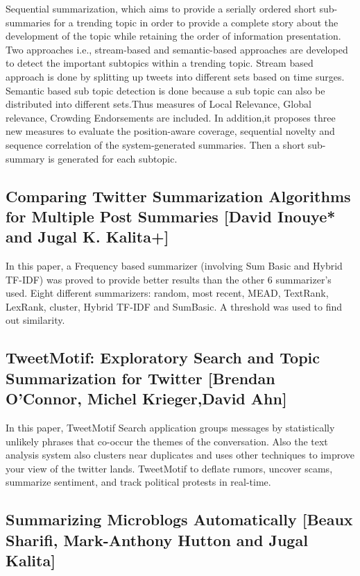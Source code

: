 \documentclass[conference]{IEEEtran}
\begin{document}
\par Sequential summarization, which aims to provide a serially  ordered short sub-summaries for a trending topic in order to provide a complete story about the development of the topic while retaining the order of information presentation. Two approaches i.e., stream-based and semantic-based approaches are developed to detect the important subtopics within a trending topic. Stream based approach is done by splitting up tweets into different sets based on time surges. Semantic based sub topic detection is done because a sub topic can also be distributed into different sets.Thus measures of Local Relevance, Global relevance, Crowding Endorsements are included. In addition,it proposes three new measures to evaluate the position-aware coverage, sequential novelty and sequence correlation of the system-generated summaries. Then a short sub-summary is generated for each subtopic.

\subsection{\textbf{Comparing Twitter Summarization Algorithms for Multiple Post Summaries [David Inouye* and Jugal K. Kalita+]}}

\par In this paper, a Frequency based summarizer (involving Sum Basic and Hybrid TF-IDF) was proved to provide better results than the other 6 summarizer’s used. Eight different summarizers: random, most recent, MEAD, TextRank, LexRank, cluster, Hybrid TF-IDF and SumBasic. A threshold was used to find out similarity.

\subsection{\textbf{TweetMotif: Exploratory Search and Topic Summarization for Twitter [Brendan O’Connor, Michel Krieger,David Ahn]}}

\par In this paper, TweetMotif Search application groups messages by statistically unlikely phrases that co-occur the themes of the conversation. Also the text analysis system also clusters near duplicates and uses other techniques to improve your view of the twitter lands. TweetMotif to deflate rumors, uncover scams, summarize sentiment, and track political protests in real-time.

\subsection{\textbf{Summarizing Microblogs Automatically [Beaux Sharifi, Mark-Anthony Hutton and Jugal Kalita]}}
\end{document}
